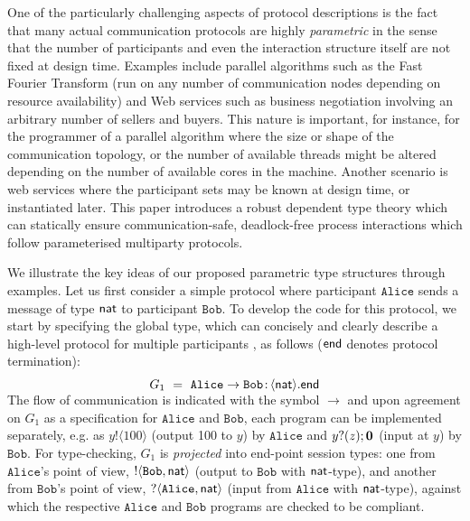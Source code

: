 \documentclass{LMCS}
\newcommand{\kf}[1]{\textup{\textsf{#1}}\xspace}
\newcommand{\End}{\kf{end}}
\newcommand{\Nat}{\kf{nat}}
\newcommand{\ENCan}[1]{\langle #1 \rangle}
\newcommand{\TO}[2]{#1\to #2}
\newcommand{\GS}[3]{\TO{#1}{#2}\colon \!\ENCan{#3}}
\newcommand{\Alice}{\ensuremath{\mathtt{Alice}}}
\newcommand{\Bob}{\ensuremath{\mathtt{Bob}}}
\begin{document}
One of the particularly challenging aspects of protocol descriptions
is the fact that many actual communication protocols are
highly {\em parametric}
in the sense that the number of participants  and
even the interaction structure itself are not fixed at design time.
Examples include parallel algorithms such as
the Fast  Fourier Transform (run on any number of
communication nodes depending on resource availability)
and Web
services such as business negotiation involving an
arbitrary number of sellers and buyers.
This nature is important, for instance,
for the programmer of a parallel algorithm
where the size or shape of the communication topology,
or the number of available threads might
be altered depending on the number
of available cores in the machine.
Another scenario is web services where the
participant sets may be known at design time,
or instantiated later.
This paper introduces a robust dependent type theory
which can statically ensure communication-safe, deadlock-free process
interactions which follow parameterised multiparty protocols.

We illustrate the key ideas of our proposed parametric type structures
through examples. Let us first consider a simple protocol where
participant $\Alice$ sends a message of type $\Nat$ to participant
$\Bob$.  To develop the code for this protocol, we start by specifying
the global type, which can concisely and clearly describe a high-level
protocol for multiple participants
\cite{CHY07,BettiniCDLDY08LONG,esop09}, as follows ($\End$ denotes
protocol termination):
\[
\begin{array}{c}
G_1  \ = \ \GS{\Alice}{\Bob}{\Nat}.\End\\[-2ex]
\end{array}
\]
The flow of communication is indicated with the symbol $\rightarrow$ and
upon agreement on $G_1$ as a specification for $\Alice$ and $\Bob$,
each program can be implemented separately,
e.g. as $y!\ENCan{100}$ (output 100 to $y$) by $\Alice$ and
$y?(z);{\bf 0}$ (input at $y$) by $\Bob$.
For type-checking, $G_1$ is
{\em projected} into end-point session types:
one from $\Alice$'s point of view,
$!\ENCan{\Bob,\Nat}$ (output to $\Bob$ with $\Nat$-type),
and another from $\Bob$'s point of view, $?\ENCan{\Alice,\Nat}$
(input from $\Alice$ with $\Nat$-type), against which
the respective $\Alice$ and $\Bob$ programs are checked to be compliant.
\end{document}
